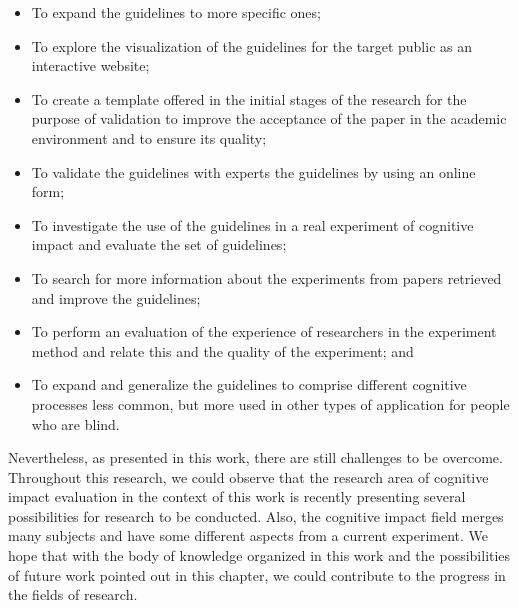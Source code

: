     \begin{itemize}
        \item To expand the guidelines to more specific ones;
        \item To explore the visualization of the guidelines for the target public as an interactive website;
        \item To create a template offered in the initial stages of the research for the purpose of validation to improve the acceptance of the paper in the academic environment and to ensure its quality;
        \item To validate the guidelines with experts the guidelines by using an online form;
        \item To investigate the use of the guidelines in a real experiment of cognitive impact and evaluate the set of guidelines;
        \item To search for more information about the experiments from papers retrieved and improve the guidelines;
        \item To perform an evaluation of the experience of researchers in the experiment method and relate this and the quality of the experiment; and
        \item To expand and generalize the guidelines to comprise different cognitive processes less common, but more used in other types of application for people who are blind. 
    \end{itemize}

Nevertheless, as presented in this work, there are still challenges to be overcome. Throughout this research, we could observe that the research area of cognitive impact evaluation in the context of this work is recently presenting several possibilities for research to be conducted. Also, the cognitive impact field merges many subjects and have some different aspects from a current experiment. We hope that with the body of knowledge organized in this work and the possibilities of future work pointed out in this chapter, we could contribute to the progress in the fields of research.


